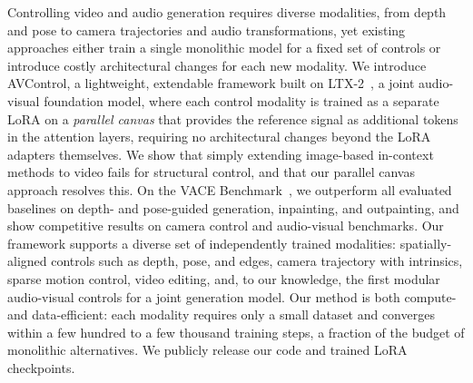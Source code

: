 Controlling video and audio generation requires diverse modalities, from depth and pose to camera trajectories and audio transformations, yet existing approaches either train a single monolithic model for a fixed set of controls or introduce costly architectural changes for each new modality.
We introduce AVControl, a lightweight, extendable framework built on LTX-2~\cite{hacohen2026ltx2}, a joint audio-visual foundation model, where each control modality is trained as a separate LoRA on a \emph{parallel canvas} that provides the reference signal as additional tokens in the attention layers, requiring no architectural changes beyond the LoRA adapters themselves.
We show that simply extending image-based in-context methods to video fails for structural control, and that our parallel canvas approach resolves this.
On the VACE Benchmark~\cite{jiang2025vace}, we outperform all evaluated baselines on depth- and pose-guided generation, inpainting, and outpainting, and show competitive results on camera control and audio-visual benchmarks.
Our framework supports a diverse set of independently trained modalities: spatially-aligned controls such as depth, pose, and edges, camera trajectory with intrinsics, sparse motion control, video editing, and, to our knowledge, the first modular audio-visual controls for a joint generation model.
Our method is both compute- and data-efficient: each modality requires only a small dataset and converges within a few hundred to a few thousand training steps, a fraction of the budget of monolithic alternatives.
We publicly release our code and trained LoRA checkpoints.
